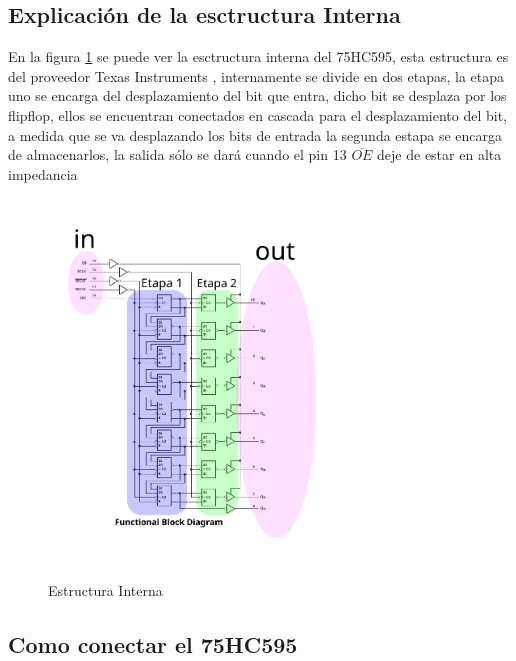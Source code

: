 \documentclass{article}
\begin{document}



\newpage
\subsection{Explicación de la esctructura Interna}

En la figura \ref{fig:Estructura Interna} se puede ver la esctructura interna del 75HC595, esta estructura es del proveedor Texas Instruments \cite{Datasheet}, internamente se divide en dos etapas, la etapa uno se encarga del desplazamiento del bit que entra, dicho bit se desplaza por los flipflop, ellos se encuentran conectados en cascada para el desplazamiento del bit, a medida que se va desplazando los bits de entrada la segunda estapa se encarga de almacenarlos, la salida sólo se dará cuando el pin 13 $\overline{OE}$ deje de estar en alta impedancia




\begin{figure}[H]
    \includegraphics[width=8cm,angle=0, height=10cm ]{imagen/estructuraInterna.pdf}
    \centering
    \caption{Estructura Interna \footnotemark}
    \label{fig:Estructura Interna}
    \end{figure}
    

\subsection{Como conectar el 75HC595}
\end{document}
